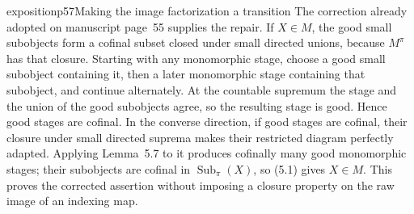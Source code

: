 \begin{dcomment}{exposition}{p57}{Making the image factorization a transition}
The correction already adopted on manuscript page~55 supplies the repair. If $X\in M$, the good small subobjects form a cofinal subset closed under small directed unions, because $M^\pi$ has that closure. Starting with any monomorphic stage, choose a good small subobject containing it, then a later monomorphic stage containing that subobject, and continue alternately. At the countable supremum the stage and the union of the good subobjects agree, so the resulting stage is good. Hence good stages are cofinal. In the converse direction, if good stages are cofinal, their closure under small directed suprema makes their restricted diagram perfectly adapted. Applying Lemma~5.7 to it produces cofinally many good monomorphic stages; their subobjects are cofinal in $\operatorname{Sub}_{\pi}(X)$, so (5.1) gives $X\in M$. This proves the corrected assertion without imposing a closure property on the raw image of an indexing map.
\end{dcomment}


